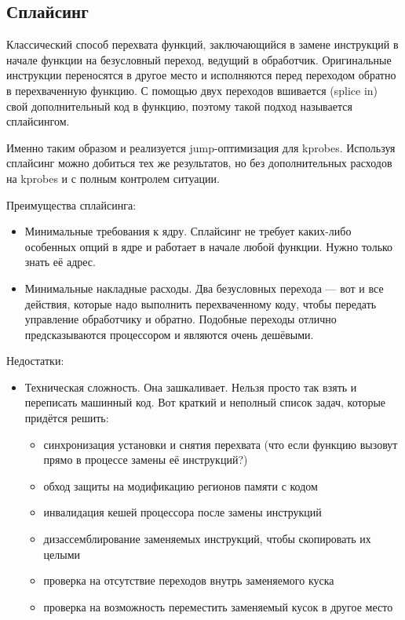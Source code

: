 \subsection{Сплайсинг}
Классический способ перехвата функций, заключающийся в замене инструкций в начале функции на безусловный переход, ведущий в обработчик. Оригинальные инструкции переносятся в другое место и исполняются перед переходом обратно в перехваченную функцию. С помощью двух переходов вшивается (splice in) свой дополнительный код в функцию, поэтому такой подход называется сплайсингом.

Именно таким образом и реализуется jump-оптимизация для kprobes. Используя сплайсинг можно добиться тех же результатов, но без дополнительных расходов на kprobes и с полным контролем ситуации.

Преимущества сплайсинга:
\begin{itemize}
	\item Минимальные требования к ядру. Сплайсинг не требует каких-либо особенных опций в ядре и работает в начале любой функции. Нужно только знать её адрес.
	\item Минимальные накладные расходы. Два безусловных перехода — вот и все действия, которые надо выполнить перехваченному коду, чтобы передать управление обработчику и обратно. Подобные переходы отлично предсказываются процессором и являются очень дешёвыми.
\end{itemize}

Недостатки:
\begin{itemize}
	\item Техническая сложность. Она зашкаливает. Нельзя просто так взять и переписать машинный код. Вот краткий и неполный список задач, которые придётся решить:
	\begin{itemize}
		\item синхронизация установки и снятия перехвата (что если функцию вызовут прямо в процессе замены её инструкций?)
		\item обход защиты на модификацию регионов памяти с кодом
		\item инвалидация кешей процессора после замены инструкций
		\item дизассемблирование заменяемых инструкций, чтобы скопировать их целыми
		\item проверка на отсутствие переходов внутрь заменяемого куска
		\item проверка на возможность переместить заменяемый кусок в другое место
	\end{itemize}
\end{itemize}

